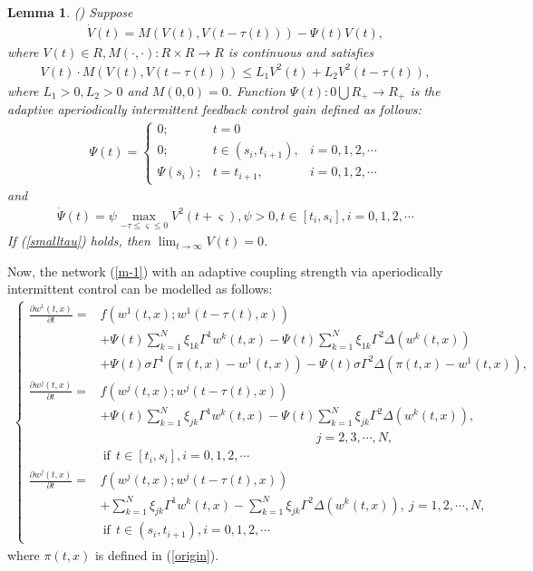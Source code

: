 \documentclass[review]{elsarticle}
\newtheorem{lem}{Lemma}
\begin{document}
\begin{lem}\label{ht}
(\cite{LC15}) Suppose
\begin{align*}
\dot{V}(t)=M(V(t), V(t-\tau(t)))-\Psi(t)V(t),
\end{align*}
where $V(t)\in R, M(\cdot, \cdot): R\times R\rightarrow R$ is continuous and satisfies
\begin{align*}
V(t)\cdot M(V(t), V(t-\tau(t)))\leq L_1V^2(t)+L_2V^2(t-\tau(t)),
\end{align*}
where $L_1>0, L_2>0$ and $M(0,0)=0$. Function $\Psi(t):{0\bigcup R_+}\rightarrow R_+$ is the adaptive aperiodically intermittent feedback control gain defined as follows:
\begin{align}\label{good}
\Psi(t)=\left\{
\begin{array}{lll}
0; & t=0\\
0; & t\in (s_i,t_{i+1}),&i=0,1,2,\cdots\\
\Psi(s_i); &t=t_{i+1},&i=0,1,2,\cdots
\end{array}
\right.
\end{align}
and
\begin{align}
\dot{\Psi}(t)=\psi\max\limits_{-{\tau}\leq \varsigma\leq 0}V^2(t+\varsigma), \psi>0, t\in [t_i, s_i], i=0,1,2,\cdots
\end{align}
If (\ref{smalltau}) holds, then $\lim_{t\rightarrow \infty}V(t)=0$.
\end{lem}

Now, the network (\ref{m-1}) with an adaptive coupling strength via aperiodically intermittent control can be modelled as follows:
\begin{align}\label{a-1}
\left\{
\begin{array}{cl}
\frac{\partial{w^1(t,x)}}{\partial{t}}=&f(w^1(t,x);w^1(t-\tau(t),x))\\
&+\Psi(t)\sum\limits_{k=1}^N\xi_{1k}\Gamma^1
w^k(t,x)-\Psi(t)\sum\limits_{k=1}^N\xi_{1k}\Gamma^2
\Delta(w^k(t,x))\\
&+\Psi(t)\sigma\Gamma^1 (\pi(t,x)-w^1(t,x))-\Psi(t)\sigma\Gamma^2 \Delta(\pi(t,x)-w^1(t,x)),\\
\frac{\partial{w^j(t,x)}}{\partial{t}}=&f(w^j(t,x);w^j(t-\tau(t),x))\\
&+\Psi(t)\sum\limits_{k=1}^N\xi_{jk}\Gamma^1
w^k(t,x)-\Psi(t)\sum\limits_{k=1}^N\xi_{jk}\Gamma^2
\Delta(w^k(t,x)), \\
&~~~~~~~~~~~~~~~~~~~~~~~~~~~~~~~~~~~~~~~~~~~~~~~~~~~~~~~~~~~~~~~~~~~~~~~~~~~~~j=2,3,\cdots,N,\\
&~\mathrm{if}~~t\in [t_i,s_i], i=0,1,2,\cdots\\
\frac{\partial{w^j(t,x)}}{\partial{t}}=&f(w^j(t,x);w^j(t-\tau(t),x))\\
&+\sum\limits_{k=1}^N\xi_{jk}\Gamma^1
w^k(t,x)-\sum\limits_{k=1}^N\xi_{jk}\Gamma^2
\Delta(w^k(t,x)), ~j=1,2,\cdots,N,\\
&~\mathrm{if}~~t\in (s_i,t_{i+1}), i=0,1,2,\cdots
\end{array}
\right.
\end{align}
where $\pi(t,x)$ is defined in (\ref{origin}).
\end{document}
